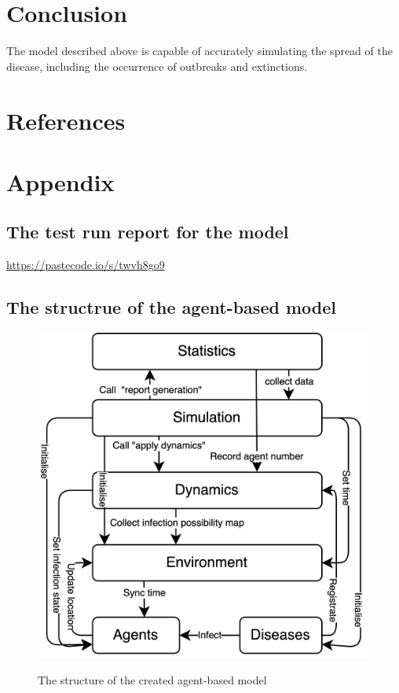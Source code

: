 \documentclass[12pt]{article}
\begin{document}
\section{Conclusion}
The model described above is capable of accurately simulating the spread of the disease, including the occurrence of outbreaks and extinctions.

\section{References}
\printbibliography[heading=none]

\newpage

\section{Appendix}
\begin{appendices}
    \subsection{The test run report for the model}
    \url{https://pastecode.io/s/twvh8go9}

    \subsection{The structrue of the agent-based model}
    \begin{figure}[ht]
		\centering
		\includegraphics[width=0.6\linewidth]{./assets/model-structure.png}
        \label{fig:model-structure}
		\caption{\scriptsize \sffamily The structure of the created agent-based model} 
	\end{figure}


\end{appendices}
\end{document}
